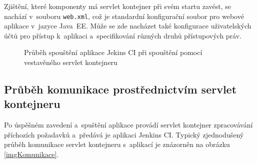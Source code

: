             Zjištění, které komponenty má servlet kontejner při svém startu zavést,
            se nachází v~souboru \texttt{web.xml}, což je standardní konfigurační soubor
            pro webové aplikace v~jazyce Java~EE. Může se zde nacházet také
            konfigurace uživatelských účtů pro přístup k~aplikaci a~specifikování
            různých druhů přístupových práv.


            \begin{figure}[h!t]
                \begin{center}
                    \caption{Průběh spouštění aplikace Jekins CI při spouštění pomocí vestavěného servlet kontejneru}
                    \label{imgArchitekturaSpusteni}
                \end{center}
            \end{figure}


        \subsection{Průběh komunikace prostřednictvím servlet kontejneru}
            Po úspěšném zavedení a~spuštění aplikace provádí servlet kontejner
            zpracovávání příchozích požadavků a~předává je aplikaci Jenkins CI. 
            Typický zjednodušený průběh komunikace servlet kontejneru s~aplikací je znázorněn
            na obrázku \ref{imgKomunikace}. 

